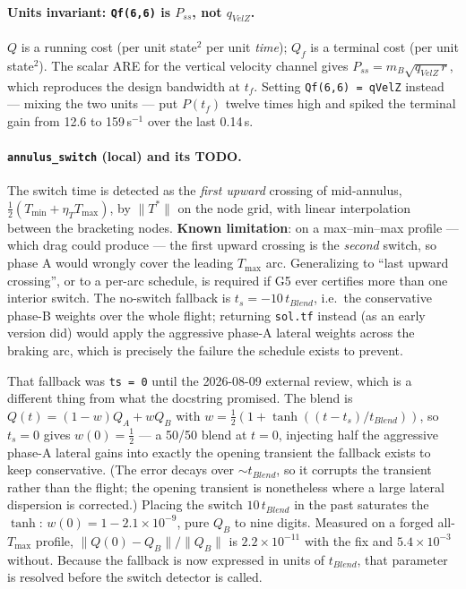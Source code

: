 \documentclass[11pt]{article}
\newcommand{\Tmin}{T_{\min}}
\newcommand{\Tmax}{T_{\max}}
\newcommand{\etaT}{\eta_T}
\begin{document}
\paragraph{Units invariant: \texttt{Qf(6,6)} is $P_{ss}$, not $q_{VelZ}$.}
$Q$ is a running cost (per unit state$^2$ per unit \emph{time}); $Q_f$ is a
terminal cost (per unit state$^2$). The scalar ARE for the vertical velocity
channel gives $P_{ss} = m_B\sqrt{q_{VelZ}\,r}$, which reproduces the design
bandwidth at $t_f$. Setting \texttt{Qf(6,6) = qVelZ} instead --- mixing the
two units --- put $P(t_f)$ twelve times high and spiked the terminal gain
from 12.6 to 159\,s$^{-1}$ over the last 0.14\,s.

\paragraph{\texttt{annulus\_switch} (local) and its TODO.} The switch time is
detected as the \emph{first upward} crossing of mid-annulus,
$\tfrac12(\Tmin + \etaT\Tmax)$, by $\lVert T^*\rVert$ on the node grid, with
linear interpolation between the bracketing nodes. \textbf{Known
limitation}: on a max--min--max profile --- which drag could produce --- the
first upward crossing is the \emph{second} switch, so phase A would wrongly
cover the leading $\Tmax$ arc. Generalizing to ``last upward crossing'', or
to a per-arc schedule, is required if G5 ever certifies more than one
interior switch. The no-switch fallback is $t_s = -10\,t_{Blend}$, i.e.\ the
conservative phase-B weights over the whole flight; returning \texttt{sol.tf}
instead (as an early version did) would apply the aggressive phase-A lateral
weights across the braking arc, which is precisely the failure the schedule
exists to prevent.

That fallback was \texttt{ts = 0} until the 2026-08-09 external review,
which is a different thing from what the docstring promised. The blend is
$Q(t) = (1-w)Q_A + wQ_B$ with $w = \tfrac12(1+\tanh((t-t_s)/t_{Blend}))$, so
$t_s=0$ gives $w(0)=\tfrac12$ --- a 50/50 blend at $t=0$, injecting half the
aggressive phase-A lateral gains into exactly the opening transient the
fallback exists to keep conservative. (The error decays over $\sim
t_{Blend}$, so it corrupts the transient rather than the flight; the opening
transient is nonetheless where a large lateral dispersion is corrected.)
Placing the switch $10\,t_{Blend}$ in the past saturates the $\tanh$:
$w(0) = 1 - 2.1\times10^{-9}$, pure $Q_B$ to nine digits. Measured on a
forged all-$\Tmax$ profile, $\lVert Q(0)-Q_B\rVert/\lVert Q_B\rVert$ is
$2.2\times10^{-11}$ with the fix and $5.4\times10^{-3}$ without. Because
the fallback is now expressed in units of $t_{Blend}$, that parameter is
resolved before the switch detector is called.
\end{document}
